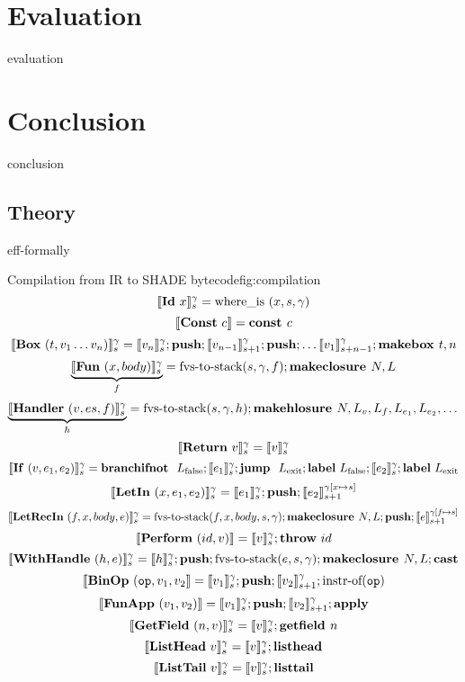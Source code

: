 \documentclass[%
    12pt,
    a4paper,
    bibliography=toc,
    listof=leveldown,%
    oneside
]{book}
\begin{document}
\chapter{Evaluation}
{evaluation}

\chapter{Conclusion}
{conclusion}

{}


\appendix

\begin{appendices}
\renewcommand{\thepage}{\thechapter.\arabic{page}}

\chapter{Theory}
\label{app:theory}
\setcounter{page}{1}
{eff-formally}

\begin{myfigure}[1]{Compilation from IR to SHADE bytecode}{fig:compilation}
    $$ \interp{\irId\ x}_s^\gamma = \text{where\_is}\ (x, s, \gamma) $$
    $$ \interp{\irConst\ c} = \textbf{const } c $$
    $$ \llbracket \mathbf{Box}\ (t, v_1 \dots v_n) \rrbracket_s ^ \gamma = \llbracket v_n \rrbracket_s^\gamma; \textbf{push}; \llbracket v_{n-1} \rrbracket_{s+1}^\gamma; \textbf{push}; \dots \llbracket v_1 \rrbracket_{s+n-1}^\gamma; \textbf{makebox }t, n $$
    $$ \underbrace{\llbracket \mathbf{Fun}\ (x, body) \rrbracket_s ^\gamma }_f = \text{fvs-to-stack} (s, \gamma, f); \textbf{makeclosure }N, L $$
    $$ \underbrace{\llbracket \mathbf{Handler}\ (v, es, f) \rrbracket_s^\gamma}_h = \text{fvs-to-stack} (s, \gamma, h); \textbf{makehlosure }N, L_v, L_f, L_{e_1}, L_{e_2}, \dots $$
    $$ \llbracket \mathbf{Return}\ v \rrbracket_s ^ \gamma =  \llbracket v \rrbracket_s ^ \gamma $$
    $$ \llbracket \mathbf{If}\ (v, e_1, e_2) \rrbracket_s ^ \gamma = \textbf{branchifnot }\ L_\text{false}; \llbracket e_1 \rrbracket_s^\gamma; \textbf{jump }\ L_\text{exit}; \textbf{label}\ L_\text{false}; \llbracket e_2 \rrbracket_s^\gamma; \textbf{label}\ L_\text{exit} $$
    $$ \llbracket \mathbf{LetIn}\ (x, e_1, e_2) \rrbracket_s^\gamma = \llbracket e_1 \rrbracket_s^\gamma; \textbf{push}; \llbracket e_2 \rrbracket_{s+1}^{\gamma[x \mapsto s]} $$
    $$ \llbracket \mathbf{LetRecIn}\ (f, x, body, e) \rrbracket_s^\gamma = \text{fvs-to-stack}(f, x, body, s, \gamma); \textbf{makeclosure }N, L; \textbf{push}; \llbracket e \rrbracket_{s+1}^{\gamma[f \mapsto s]} $$
    $$ \llbracket \mathbf{Perform}\ (id, v) \rrbracket = \llbracket v \rrbracket_s ^ \gamma; \textbf{throw}\ id $$
    $$ \llbracket \mathbf{WithHandle}\ (h, e) \rrbracket_s ^ \gamma = \llbracket h \rrbracket_s ^ \gamma; \textbf{push}; \text{fvs-to-stack}(e, s, \gamma); \textbf{makeclosure }N, L; \mathbf{cast} $$
    $$ \llbracket \mathbf{BinOp}\ (\mathtt{op}, v_1, v_2 \rrbracket = \llbracket v_1 \rrbracket_s ^ \gamma; \textbf{push}; \llbracket v_2 \rrbracket_{s+1}^\gamma; \text{instr-of}(\mathtt{op}) $$
    $$ \llbracket \mathbf{FunApp}\ (v_1, v_2) \rrbracket = \llbracket v_1 \rrbracket_s ^ \gamma; \textbf{push}; \llbracket v_2 \rrbracket_{s+1} ^ \gamma; \textbf{apply} $$
    $$ \llbracket \mathbf{GetField}\ (n, v) \rrbracket_s ^ \gamma = \llbracket v \rrbracket_s ^ \gamma; \textbf{getfield }n $$
    $$ \llbracket \mathbf{ListHead}\ v \rrbracket_s ^ \gamma = \llbracket v \rrbracket_s ^ \gamma; \textbf{listhead} $$
    $$ \llbracket \mathbf{ListTail}\ v \rrbracket_s ^ \gamma = \llbracket v \rrbracket_s ^ \gamma ; \textbf{listtail} $$
\end{myfigure}


\end{appendices}
\end{document}

